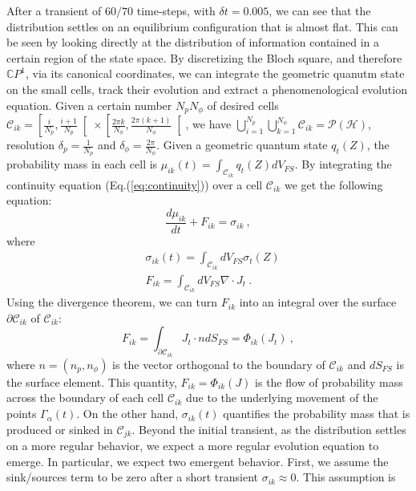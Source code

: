 \documentclass[%
 reprint,
 superscriptaddress,
 aps,
 pra,
]{revtex4-2}
\newcommand{\CC}[2]{\mathcal{C}_{#1 #2}}
\newcommand{\PH}{\mathcal{P}(\mathcal{H})}
\theoremstyle{definition}
\begin{document}
After a transient of $60/70$ time-steps, with $\delta t = 0.005$, we can see that the distribution
settles on an equilibrium configuration that is almost flat. This can be seen by looking
directly at the distribution of information contained in a certain region of the state space.
By discretizing the Bloch square, and therefore $\mathbb{C}P^1$, via its canonical coordinates,
we can integrate the geometric quanutm state on the small cells, track their evolution and
extract a phenomenological evolution equation. 
Given a certain number $N_p N_\phi$ of desired cells  $\mathcal{C}_{ik} = \left[ \frac{i}{N_p}, \frac{i+1}{N_p}\right[ \times \left[ \frac{2\pi k}{N_{\phi}},\frac{2\pi (k+1)}{N_{\phi}}\right[$,
we have $\bigcup_{i=1}^{N_p}\bigcup_{k=1}^{N_{\phi}}\mathcal{C}_{ik} = \PH$, resolution $\delta_p = \frac{1}{N_p}$ and
$\delta_\phi = \frac{2\pi}{N_\phi}$.
Given a geometric quantum state $q_t(Z)$, the probability mass in each cell is $\mu_{ik}(t) = \int_{\mathcal{C}_{ik}}q_t(Z) dV_{FS}$.
By integrating the continuity equation (Eq.(\ref{eq:continuity})) over a cell $\mathcal{C}_{ik}$
we get the following equation:
\begin{equation}
\frac{d\mu_{ik}}{dt} + F_{ik} = \sigma_{ik}~,
\end{equation}
where
\begin{align}
&\sigma_{ik}(t) = \int_{\mathcal{C}_{ik}} \!\!\! dV_{FS} \sigma_t(Z)  \\
&F_{ik} = \int_{\mathcal{C}_{ik}} \!\!\! dV_{FS} \nabla \cdot J_t~.
\end{align}
Using the divergence theorem, we can turn $F_{ik}$ into an integral
over the surface $\partial \CC{i}{k}$ of $\CC{i}{k}$:
\begin{equation}
F_{ik} = \int_{\partial \mathcal{C}_{ik}} \!\!\!  J_t \cdot n dS_{FS} = \Phi_{ik}(J_t)~,
\end{equation}
where $n=(n_p,n_\phi)$ is the vector orthogonal to the boundary of $\CC{i}{k}$
and $dS_{FS}$ is the surface element. This quantity, $F_{ik}=\Phi_{ik}(J)$ is 
the flow of probability mass across the boundary of each cell $\CC{i}{k}$
due to the underlying movement of the points $\Gamma_\alpha(t)$. On the other
hand, $\sigma_{ik}(t)$ quantifies the probability mass that is produced or sinked
in $\CC{j}{k}$. Beyond the initial transient, as the distribution settles on a more
regular behavior, we expect a more regular evolution equation to emerge. In
particular, we expect two emergent behavior. First, we assume the sink/sources
term to be zero after a short transient $\sigma_{ik} \approx 0$. This assumption is
\end{document}
